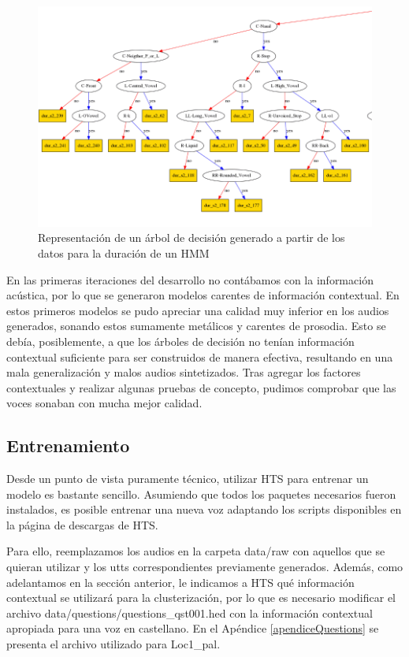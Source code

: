 \begin{figure}
\begin{center}
\includegraphics[scale=0.4]{imagenes/arbolDeDesicionTesis.png}
\caption{Representación de un árbol de decisión generado a partir de los datos para la duración de un HMM}
\label{genTree}
\end{center}
\end{figure}

En las primeras iteraciones del desarrollo no contábamos con la información acústica, por lo que se generaron modelos carentes de información contextual. En estos primeros modelos se pudo apreciar una calidad muy inferior en los audios generados, sonando estos sumamente metálicos y carentes de prosodia. Esto se debía, posiblemente, a que los árboles de decisión no tenían información contextual suficiente para ser construidos de manera efectiva, resultando en una mala generalización y malos audios sintetizados. Tras agregar los factores contextuales y realizar algunas pruebas de concepto, pudimos comprobar que las voces sonaban con mucha mejor calidad.


\subsection{Entrenamiento} \label{entrenamientoHTS}

Desde un punto de vista puramente técnico, utilizar HTS para entrenar un modelo es bastante sencillo. Asumiendo que todos los paquetes necesarios fueron instalados, es posible entrenar una nueva voz adaptando los scripts disponibles en la página de descargas de HTS.

Para ello, reemplazamos los audios en la carpeta data/raw con aquellos que se quieran utilizar y los utts correspondientes previamente generados. Además, como adelantamos en la sección anterior, le indicamos a HTS qué información contextual se utilizará para la clusterización, por lo que es necesario modificar el archivo data/questions/questions\_qst001.hed con la información contextual apropiada para una voz en castellano. En el Apéndice \ref{apendiceQuestions} se presenta el archivo utilizado para Loc1\_pal.

